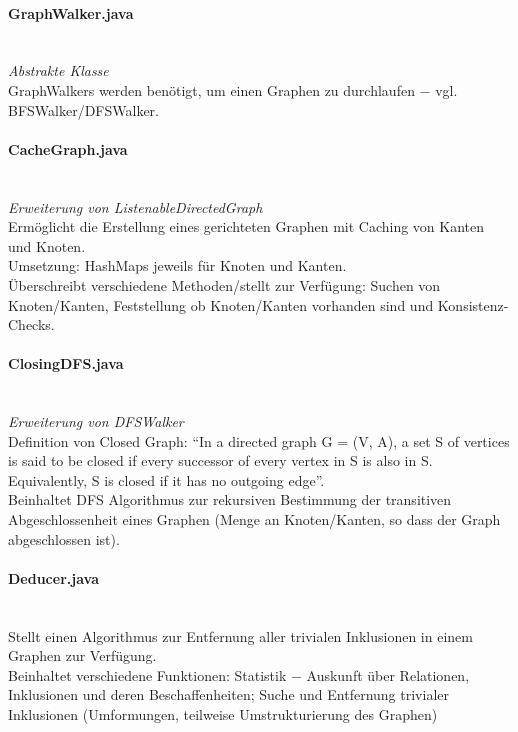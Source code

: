 \documentclass[10pt,a4paper]{article}
\begin{document}
\paragraph{GraphWalker.java}\ \\
\emph{Abstrakte Klasse}\\
GraphWalkers werden benötigt, um einen Graphen zu durchlaufen $-$ vgl. BFSWalker/DFSWalker. \\

\paragraph{CacheGraph.java}\ \\
\emph{Erweiterung von ListenableDirectedGraph}\\
Ermöglicht die Erstellung eines gerichteten Graphen mit Caching von Kanten und Knoten.\\
Umsetzung: HashMaps jeweils für Knoten und Kanten.\\
Überschreibt verschiedene Methoden/stellt zur Verfügung: Suchen von Knoten/Kanten, Feststellung ob Knoten/Kanten vorhanden sind und Konsistenz-Checks.\\

\paragraph{ClosingDFS.java}\ \\
\emph{Erweiterung von DFSWalker}\\
Definition von Closed Graph: "`In a directed graph G = (V, A), a set S of vertices is said to be closed if every successor of every vertex in S is also in S. Equivalently, S is closed if it has no outgoing edge"'.\\
Beinhaltet DFS Algorithmus zur rekursiven Bestimmung der transitiven Abgeschlossenheit eines Graphen (Menge an Knoten/Kanten, so dass der Graph abgeschlossen ist).\\

\paragraph{Deducer.java}\ \\
Stellt einen Algorithmus zur Entfernung aller trivialen Inklusionen in einem Graphen zur Verfügung.\\
Beinhaltet verschiedene Funktionen: Statistik $-$ Auskunft über Relationen, Inklusionen und deren Beschaffenheiten; Suche und Entfernung trivialer Inklusionen (Umformungen, teilweise Umstrukturierung des Graphen)\\
\end{document}

